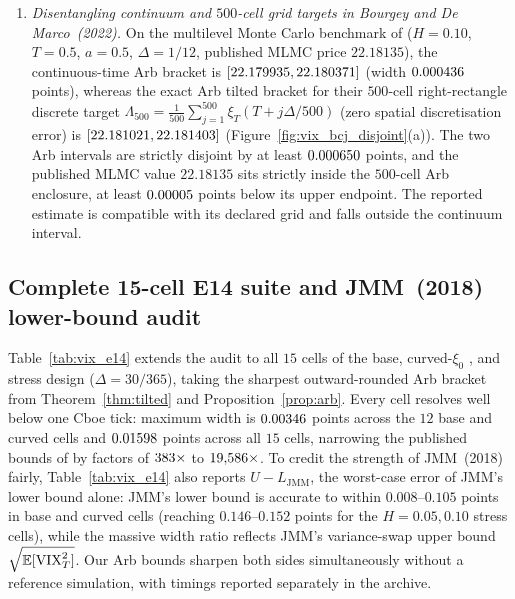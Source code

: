 \begin{enumerate}
  $T=3$\,m) and $-\LNGapBCJ$ points ($\TickLNBCJ$ ticks) in BCJ~\S5.3 ($H=0.10$, $\eta_{\mathrm{P1}}=1.9$,
  $T=6$\,m).
\item \emph{Disentangling continuum and $500$-cell grid targets in Bourgey and De Marco~(2022).}
  On the multilevel Monte Carlo benchmark of \citet[Section~3.3]{BourgeyDeMarco2022} ($H=0.10$, $T=0.5$,
  $a=0.5$, $\Delta=1/12$, published MLMC price $22.18135$), the continuous-time Arb bracket is
  $[22.179935,22.180371]$ (width $0.000436$ points), whereas the exact Arb tilted bracket for
  their $500$-cell right-rectangle discrete target $\Lambda_{500}=\frac{1}{500}\sum_{j=1}^{500}\xi_T(T+j\Delta/500)$
  (zero spatial discretisation error) is $[22.181021,22.181403]$ (Figure~\ref{fig:vix_bcj_disjoint}(a)).
  The two Arb intervals are strictly disjoint by at least $0.000650$ points, and the published
  MLMC value $22.18135$ sits strictly inside the $500$-cell Arb enclosure, at least $0.00005$ points
  below its upper endpoint. The reported estimate is compatible with its declared grid and falls outside the continuum interval.
\end{enumerate}


\subsection{Complete 15-cell E14 suite and JMM~(2018) lower-bound audit}\label{sec:vix_e14}
Table~\ref{tab:vix_e14} extends the audit to all $15$ cells of the base, curved-$\xi_0$
\citep[Scenario~2: $\xi_0(t)=0.234^2(1+t)^2$]{JacquierMartiniMuguruza2018}, and stress design
($\Delta=30/365$), taking the sharpest outward-rounded Arb bracket from Theorem~\ref{thm:tilted} and
Proposition~\ref{prop:arb}. Every cell resolves well below one Cboe tick: maximum width is
$0.00346$ points across the $12$ base and curved cells and $0.01598$ points across
all $15$ cells, narrowing the published bounds of \citet[Theorem~3.3]{JacquierMartiniMuguruza2018} by
factors of $383\times$ to $19{,}586\times$. To credit the strength of JMM~(2018) fairly,
Table~\ref{tab:vix_e14} also reports $U-L_{\mathrm{JMM}}$, the worst-case error of JMM's lower bound
alone: JMM's lower bound is accurate to within $0.008$--$0.105$ points in base and curved cells (reaching
$0.146$--$0.152$ points for the $H=0.05,0.10$ stress cells), while the massive width ratio reflects JMM's variance-swap
upper bound $\sqrt{\mathbb{E}[\mathrm{VIX}_T^2]}$. Our Arb bounds sharpen both sides simultaneously without a
reference simulation, with timings reported separately in the archive.

